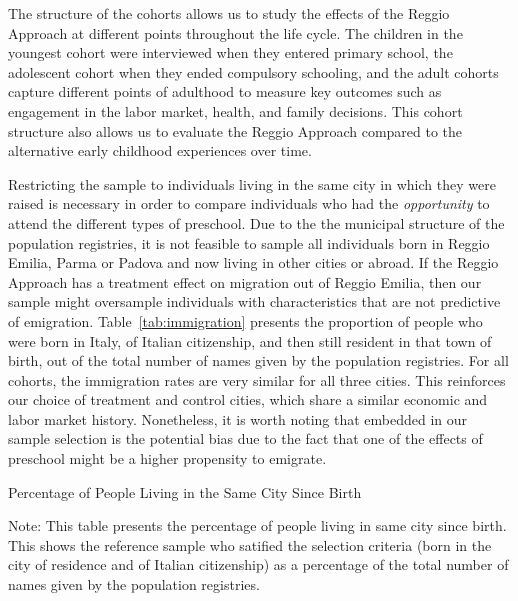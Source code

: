 The structure of the cohorts allows us to study the effects of the Reggio Approach at different points throughout the life cycle. The children in the youngest cohort were interviewed when they entered primary school, the adolescent cohort when they ended compulsory schooling, and the adult cohorts capture different points of adulthood to measure key outcomes such as engagement in the labor market, health, and family decisions. This cohort structure also allows us to evaluate the Reggio Approach compared to the alternative early childhood experiences over time.

Restricting the sample to individuals living in the same city in which they were raised is necessary in order to compare individuals who had the \textit{opportunity} to attend the different types of preschool. Due to the the municipal structure of the population registries, it is not feasible to sample all individuals born in Reggio Emilia, Parma or Padova and now living in other cities or abroad. If the Reggio Approach has a treatment effect on migration out of Reggio Emilia, then our sample might oversample individuals with characteristics that are not predictive of emigration. Table~\ref{tab:immigration} presents the proportion of people who were born in Italy, of Italian citizenship, and then still resident in that town of birth, out of the total number of names given by the population registries. For all cohorts, the immigration rates are very similar for all three cities. This reinforces our choice of treatment and control cities, which share a similar economic and labor market history. Nonetheless, it is worth noting that embedded in our sample selection is the potential bias due to the fact that one of the effects of preschool might be a higher propensity to emigrate. 

\begin{table}[H]
\centering
\begin{threeparttable}
	\caption{Percentage of People Living in the Same City Since Birth}\label{tab:immigration}
	
\begin{tablenotes}
\footnotesize
Note: This table presents the percentage of people living in same city since birth. This  shows the reference sample who satified the selection criteria (born in the city of residence and of Italian citizenship) as a percentage of the total number of names given by the population registries.
\end{tablenotes}
\end{threeparttable}
\end{table}


